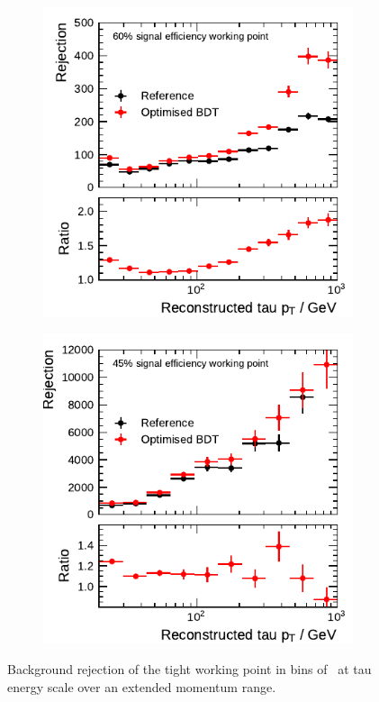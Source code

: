 \begin{figure}[htbp]
  \centering
  \begin{subfigure}[t]{0.48\textwidth}
    \centering
    \includegraphics{./figures/bdt_perf/post_optimisation/1p_highpt/rejection_tight_ratio_highpt.pdf}
  \end{subfigure}\hfill
  \begin{subfigure}[t]{0.48\textwidth}
    \centering
    \includegraphics{./figures/bdt_perf/post_optimisation/3p_highpt/rejection_tight_ratio_highpt.pdf}
  \end{subfigure}
  \caption[Background rejection of the tight working point in bins of
  \tauhadvis~\pt for the BDT-based identification (extended momentum
  range)]{Background rejection of the tight working point in bins of
    \tauhadvis~\pt at tau energy scale over an extended momentum range.}
  \label{fig:rejection_highpt}
\end{figure}

